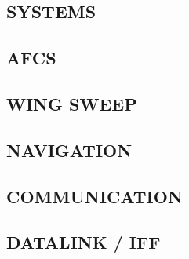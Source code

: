 \documentclass[8pt,usenames,dvipsnames,twoside]{article}
\begin{document}
		\cleardoublepage
		
		\begin{multicols*}{2}
		\section{SYSTEMS}
		
		\subsection{AFCS}
		\subsection{WING SWEEP}
		\subsection{NAVIGATION}
		\subsection{COMMUNICATION}
		\subsection{DATALINK / IFF}

\end{multicols*}
\end{document}
